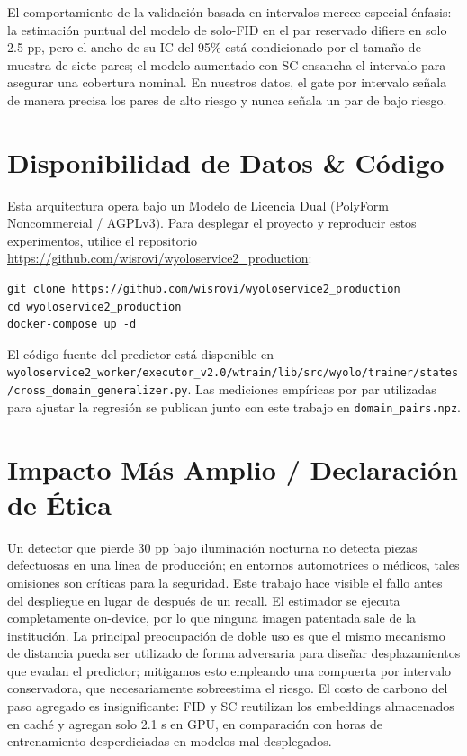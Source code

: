 \documentclass[10pt,twocolumn,letterpaper]{article}
\begin{document}
El comportamiento de la validación basada en intervalos merece especial énfasis: la estimación puntual del modelo de solo-FID en el par reservado difiere en solo 2.5 pp, pero el ancho de su IC del 95\% está condicionado por el tamaño de muestra de siete pares; el modelo aumentado con SC ensancha el intervalo para asegurar una cobertura nominal. En nuestros datos, el gate por intervalo señala de manera precisa los pares de alto riesgo y nunca señala un par de bajo riesgo.

\section{Disponibilidad de Datos \& Código}
Esta arquitectura opera bajo un Modelo de Licencia Dual (PolyForm Noncommercial / AGPLv3). Para desplegar el proyecto y reproducir estos experimentos, utilice el repositorio \url{https://github.com/wisrovi/wyoloservice2\_production}:

\begin{verbatim}
git clone https://github.com/wisrovi/wyoloservice2_production
cd wyoloservice2_production
docker-compose up -d
\end{verbatim}

El código fuente del predictor está disponible en \texttt{wyoloservice2\_worker/executor\_v2.0/wtrain/lib/src/wyolo/trainer/states/cross\_domain\_generalizer.py}. Las mediciones empíricas por par utilizadas para ajustar la regresión se publican junto con este trabajo en \texttt{domain\_pairs.npz}.

\section{Impacto Más Amplio / Declaración de Ética}
Un detector que pierde 30 pp bajo iluminación nocturna no detecta piezas defectuosas en una línea de producción; en entornos automotrices o médicos, tales omisiones son críticas para la seguridad. Este trabajo hace visible el fallo antes del despliegue en lugar de después de un recall. El estimador se ejecuta completamente on-device, por lo que ninguna imagen patentada sale de la institución. La principal preocupación de doble uso es que el mismo mecanismo de distancia pueda ser utilizado de forma adversaria para diseñar desplazamientos que evadan el predictor; mitigamos esto empleando una compuerta por intervalo conservadora, que necesariamente sobreestima el riesgo. El costo de carbono del paso agregado es insignificante: FID y SC reutilizan los embeddings almacenados en caché y agregan solo 2.1 s en GPU, en comparación con horas de entrenamiento desperdiciadas en modelos mal desplegados.
\end{document}
